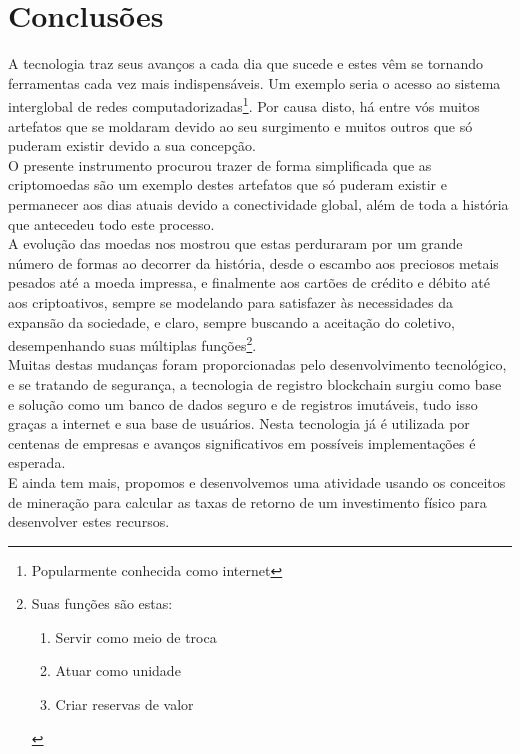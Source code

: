 \section{Conclusões}
A tecnologia traz seus avanços a cada dia que sucede e estes vêm se tornando ferramentas cada vez mais indispensáveis. Um exemplo seria o acesso ao sistema interglobal de redes computadorizadas\footnote{Popularmente conhecida como internet}. Por causa disto, há entre vós muitos artefatos que se moldaram devido ao seu surgimento e muitos outros que só puderam existir devido a sua concepção. \\
O presente instrumento procurou trazer de forma simplificada que as criptomoedas são um exemplo destes artefatos que só puderam existir e permanecer aos dias atuais devido a conectividade global, além de toda a história que antecedeu todo este processo. \\
A evolução das moedas nos mostrou que estas perduraram por um grande número de formas ao decorrer da história, desde o escambo aos preciosos metais pesados até a moeda impressa, e finalmente aos cartões de crédito e débito até aos criptoativos, sempre se modelando para satisfazer às necessidades da expansão da sociedade, e claro, sempre buscando a aceitação do coletivo, desempenhando suas múltiplas funções\footnote{Suas funções são estas:\begin{enumerate}[label=\Roman*]
		\item Servir como meio de troca
		\item Atuar como unidade
		\item Criar reservas de valor
	\end{enumerate}}.\\
Muitas destas mudanças foram proporcionadas pelo desenvolvimento tecnológico, e se tratando de segurança,  a tecnologia de registro blockchain surgiu como base e solução como um banco de dados seguro e de registros imutáveis, tudo isso graças a internet e sua base de usuários. Nesta tecnologia já é utilizada por centenas de empresas e avanços significativos em possíveis implementações é esperada. \\
E ainda tem mais, propomos e desenvolvemos uma atividade usando os conceitos de mineração para calcular as taxas de retorno de um investimento físico para desenvolver estes recursos. 


